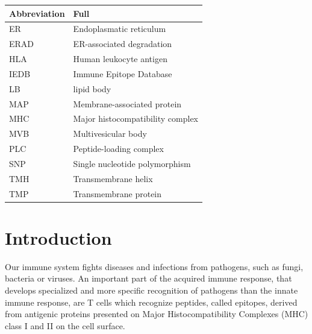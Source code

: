 \begin{table}[h]
  \begin{tabular}{ll}
    Abbreviation & Full               \\ 
    \hline
ER & Endoplasmatic reticulum \\
ERAD & ER-associated degradation \\
HLA & Human leukocyte antigen \\
IEDB & Immune Epitope Database  \\
LB & lipid body \\
MAP & Membrane-associated protein \\
MHC & Major histocompatibility complex \\
MVB & Multivesicular body \\
PLC & Peptide-loading complex \\
SNP & Single nucleotide polymorphism \\
TMH & Transmembrane helix         \\
    TMP & Transmembrane protein
  \end{tabular}
\end{table}

\clearpage

\section{Introduction}


Our immune system fights diseases and infections from pathogens, 
such as fungi, bacteria or viruses. 
An important part of the acquired immune response, 
that develops specialized and more specific recognition of pathogens 
than the innate immune response, 
are T cells which recognize peptides, called epitopes, derived from antigenic proteins presented on Major Histocompatibility Complexes (MHC) class I and II on the cell surface. 


